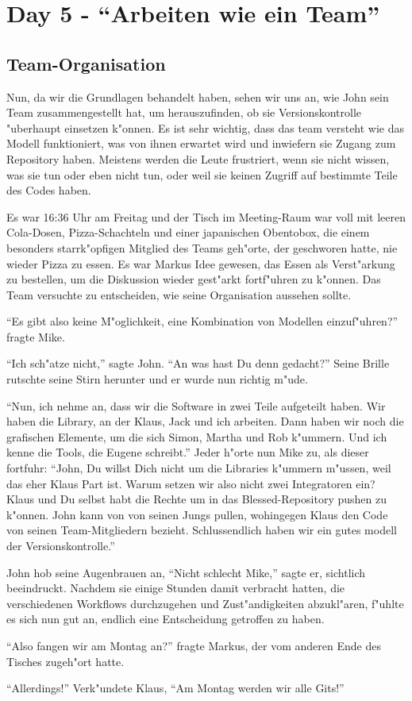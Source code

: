 \section{Day 5 - ``Arbeiten wie ein Team''}

\subsection{Team-Organisation}

Nun, da wir die Grundlagen behandelt haben, sehen wir uns an, wie John sein Team zusammengestellt hat, um herauszufinden, ob sie Versionskontrolle "uberhaupt einsetzen k"onnen. Es ist sehr wichtig, dass das team versteht wie das Modell funktioniert, was von ihnen erwartet wird und inwiefern sie Zugang zum Repository haben. Meistens werden die Leute frustriert, wenn sie nicht wissen, was sie tun oder eben nicht tun, oder weil sie keinen Zugriff auf bestimmte Teile des Codes haben.

\begin{trenches}
Es war 16:36 Uhr am Freitag und der Tisch im Meeting-Raum war voll mit leeren Cola-Dosen, Pizza-Schachteln und einer japanischen Obentobox, die einem besonders starrk"opfigen Mitglied des Teams geh"orte, der geschworen hatte, nie wieder Pizza zu essen. Es war Markus Idee gewesen, das Essen als Verst"arkung zu bestellen, um die Diskussion wieder gest"arkt fortf"uhren zu k"onnen. Das Team versuchte zu entscheiden, wie seine Organisation aussehen sollte.

``Es gibt also keine M"oglichkeit, eine Kombination von Modellen einzuf"uhren?'' fragte Mike.

``Ich sch"atze nicht,'' sagte John. ``An was hast Du denn gedacht?'' Seine Brille rutschte seine Stirn herunter und er wurde nun richtig m"ude.

``Nun, ich nehme an, dass wir die Software in zwei Teile aufgeteilt haben. Wir haben die Library, an der Klaus, Jack und ich arbeiten. Dann haben wir noch die grafischen Elemente, um die sich Simon, Martha und Rob k"ummern. Und ich kenne die Tools, die Eugene schreibt.'' Jeder h"orte nun Mike zu, als dieser fortfuhr: ``John, Du willst Dich nicht um die Libraries k"ummern m"ussen, weil das eher Klaus Part ist. Warum setzen wir also nicht zwei Integratoren ein? Klaus und Du selbst habt die Rechte um in das Blessed-Repository pushen zu k"onnen. John kann von von seinen Jungs pullen, wohingegen Klaus den Code von seinen Team-Mitgliedern bezieht. Schlussendlich haben wir ein gutes modell der Versionskontrolle.'' 

John hob seine Augenbrauen an, ``Nicht schlecht Mike,'' sagte er, sichtlich beeindruckt. Nachdem sie einige Stunden damit verbracht hatten, die verschiedenen Workflows durchzugehen und Zust"andigkeiten abzukl"aren, f"uhlte es sich nun gut an, endlich eine Entscheidung getroffen zu haben.

``Also fangen wir am Montag an?'' fragte Markus, der vom anderen Ende des Tisches zugeh"ort hatte.

``Allerdings!'' Verk"undete Klaus, ``Am Montag werden wir alle Gits!''
\end{trenches}
